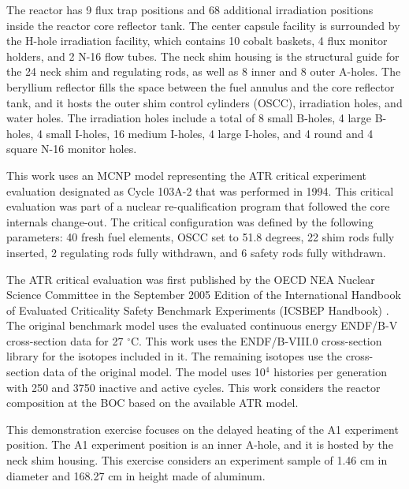 \documentclass{style/nseJournal}
\begin{document}
The reactor has 9 flux trap positions and 68 additional irradiation positions inside the reactor core reflector tank.
The center capsule facility is surrounded by the H-hole irradiation facility, which contains 10 cobalt baskets, 4 flux monitor holders, and 2 N-16 flow tubes.
The neck shim housing is the structural guide for the 24 neck shim and regulating rods, as well as 8 inner and 8 outer A-holes.
The beryllium reflector fills the space between the fuel annulus and the core reflector tank, and it hosts the outer shim control cylinders (OSCC), irradiation holes, and water holes.
The irradiation holes include a total of 8 small B-holes, 4 large B-holes, 4 small I-holes, 16 medium I-holes, 4 large I-holes, and 4 round and 4 square N-16 monitor holes.

This work uses an MCNP model representing the ATR critical experiment evaluation designated as Cycle 103A-2 that was performed in 1994.
This critical evaluation was part of a nuclear re-qualification program that followed the core internals change-out.
The critical configuration was defined by the following parameters: 40 fresh fuel elements, OSCC set to 51.8 degrees, 22 shim rods fully inserted, 2 regulating rods fully withdrawn, and 6 safety rods fully withdrawn.

The ATR critical evaluation was first published by the OECD NEA Nuclear Science Committee in the September 2005 Edition of the International Handbook of Evaluated Criticality Safety Benchmark Experiments (ICSBEP Handbook) \cite{ICSBEP}.
The original benchmark model uses the evaluated continuous energy ENDF/B-V cross-section data for 27 $^{\circ}$C.
This work uses the ENDF/B-VIII.0 cross-section library for the isotopes included in it.
The remaining isotopes use the cross-section data of the original model.
The model uses 10$^4$ histories per generation with 250 and 3750 inactive and active cycles.
This work considers the reactor composition at the \gls*{BOC} based on the available ATR model.

This demonstration exercise focuses on the delayed heating of the A1 experiment position.
The A1 experiment position is an inner A-hole, and it is hosted by the neck shim housing.
This exercise considers an experiment sample of 1.46 cm in diameter and 168.27 cm in height made of aluminum.
\end{document}
